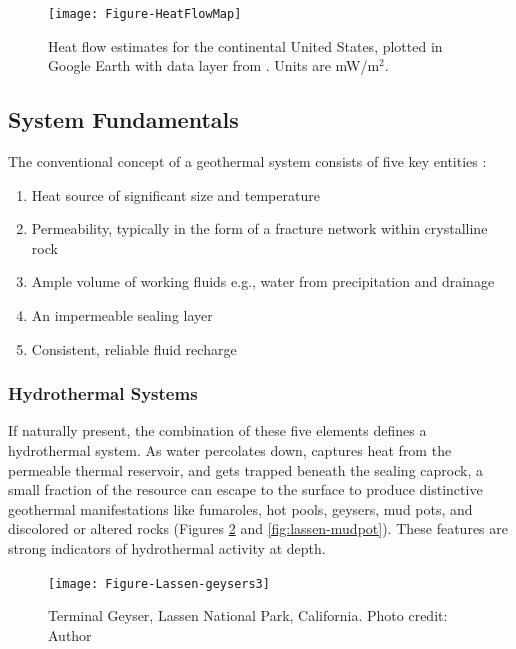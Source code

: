 \begin{figure}
\centering
\texttt{[image: Figure-HeatFlowMap]}
\caption[Heat flow across the continental U.S.]{Heat flow estimates for the continental United States, plotted in Google Earth with data layer from \protect\citep{lucazeau_analysis_2019}. Units are mW/m$^2$.}
\label{fig:heatflow}
\end{figure}
\vfill
\subsection{System Fundamentals}\label{ch2:sysfund}

The conventional concept of a geothermal system consists of five key entities \citep[p.\ 9]{dipippo_geothermal_2012}:
\begin{enumerate}[itemsep=2pt] \label{list:sysreq}
   \renewcommand{\labelenumi}{\roman{enumi}}
   \item Heat source of significant size and temperature
   \item Permeability, typically in the form of a fracture network within crystalline rock
   \item Ample volume of working fluids e.g., water from precipitation and drainage
   \item An impermeable sealing layer
   \item Consistent, reliable fluid recharge
\end{enumerate}

\subsubsection{Hydrothermal Systems}\label{ch2:hydro}

If naturally present, the combination of these five elements defines a hydrothermal system. As water percolates down, captures heat from the permeable thermal reservoir, and gets trapped beneath the sealing caprock, a small fraction of the resource can escape to the surface to produce distinctive geothermal manifestations like fumaroles, hot pools, geysers, mud pots, and discolored or altered rocks (Figures \ref{fig:lassen-geysers} and \ref{fig:lassen-mudpot}). These features are strong indicators of hydrothermal activity at depth.

\begin{figure}
\centering
\texttt{[image: Figure-Lassen-geysers3]}
\caption[Terminal Geyser, Lassen National Park]{Terminal Geyser, Lassen National Park, California. Photo credit: Author}
\label{fig:lassen-geysers}
\end{figure}

